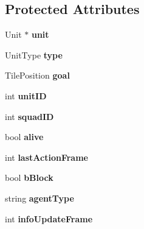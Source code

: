 \subsection*{Protected Attributes}
\begin{DoxyCompactItemize}
\item 
\hypertarget{class_base_agent_a30f94d4de1935b80800e1e6a848af750}{Unit $\ast$ {\bfseries unit}}\label{class_base_agent_a30f94d4de1935b80800e1e6a848af750}

\item 
\hypertarget{class_base_agent_ad7ae672a5f5ce2ba54dfac8b917d7711}{Unit\-Type {\bfseries type}}\label{class_base_agent_ad7ae672a5f5ce2ba54dfac8b917d7711}

\item 
\hypertarget{class_base_agent_a0f50f853d318a33279d573bbe5b2f083}{Tile\-Position {\bfseries goal}}\label{class_base_agent_a0f50f853d318a33279d573bbe5b2f083}

\item 
\hypertarget{class_base_agent_af2ff9726ba704a277b879e5444b3d320}{int {\bfseries unit\-I\-D}}\label{class_base_agent_af2ff9726ba704a277b879e5444b3d320}

\item 
\hypertarget{class_base_agent_a82b1ad78dd3c7738490b300e0ba17a10}{int {\bfseries squad\-I\-D}}\label{class_base_agent_a82b1ad78dd3c7738490b300e0ba17a10}

\item 
\hypertarget{class_base_agent_ac83ee84004ec58997fad6dcd1f8792dd}{bool {\bfseries alive}}\label{class_base_agent_ac83ee84004ec58997fad6dcd1f8792dd}

\item 
\hypertarget{class_base_agent_a1e7a82c045f67e527a5517eccbcac4fb}{int {\bfseries last\-Action\-Frame}}\label{class_base_agent_a1e7a82c045f67e527a5517eccbcac4fb}

\item 
\hypertarget{class_base_agent_ab6d7ac556de7d7782fa0866b69cd3185}{bool {\bfseries b\-Block}}\label{class_base_agent_ab6d7ac556de7d7782fa0866b69cd3185}

\item 
\hypertarget{class_base_agent_ad5b004b10b17f63e3deb1914163758c1}{string {\bfseries agent\-Type}}\label{class_base_agent_ad5b004b10b17f63e3deb1914163758c1}

\item 
\hypertarget{class_base_agent_a4b7f6658886971ff387bd30ecd45e254}{int {\bfseries info\-Update\-Frame}}\label{class_base_agent_a4b7f6658886971ff387bd30ecd45e254}


\end{DoxyCompactItemize}
